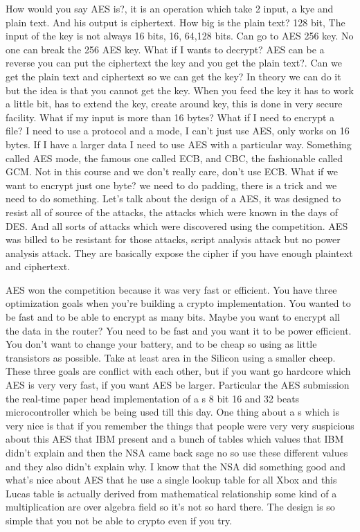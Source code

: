 How would you say AES is?, it is an operation which take 2 input, a kye and plain text. And his output is ciphertext. How big is the plain text? 128 bit, The input of the key is not always 16 bits, 16, 64,128 bits. Can go to AES 256 key. No one can break the 256 AES key.
What if I wants to decrypt? AES can be a reverse you can put the ciphertext the key and you get the plain text?. Can we get the plain text and ciphertext so we can get the key? In theory we can do it but the idea is that you cannot get the key. When you feed the key it has to work a little bit, has to extend the key, create around key, this is done in very secure facility.
What if my input is more than 16 bytes? What if I need to encrypt a file? I need to use a protocol and a mode, I can't just use AES, only works on 16 bytes. If I have a larger data I need to use AES with a particular way. Something called AES mode, the famous one called ECB, and CBC, the fashionable called GCM. Not in this course and we don't really care, don't use ECB.
What if we want to encrypt just one byte? we need to do padding, there is a trick and we need to do something.
Let's talk about the design of a AES, it was designed to resist all of source of the attacks, the attacks which were known in the days of DES. And all sorts of attacks which were discovered using the competition. AES was billed to be resistant for those attacks, script analysis attack but no power analysis attack. They are basically expose the cipher if you have enough plaintext and ciphertext.
 
AES won the competition because it was very fast or efficient. You have three optimization goals when you're building a crypto implementation. You wanted to be fast and to be able to encrypt as many bits. Maybe you want to encrypt all the data in the router? You need to be fast and you want it to be power efficient. You don't want to change your battery, and to be cheap so using as little transistors as possible. Take at least area in the Silicon using a smaller cheep. These three goals are conflict with each other, but if you want go hardcore which AES is very very fast, if you want AES be larger. Particular the AES submission the real-time paper head implementation of a s 8 bit 16 and 32 beats microcontroller which be being used till this day. One thing about a s which is very nice is that if you remember the things that people were very very suspicious about this AES that IBM present and a bunch of tables which values that IBM didn't explain and then the NSA came back sage no so use these different values and they also didn't explain why. I know that the NSA did something good and what's nice about AES that he use a single lookup table for all Xbox and this Lucas table is actually derived from mathematical relationship some kind of a multiplication are over algebra field so it's not so hard there. The design is so simple that you not be able to crypto even if you try. 

